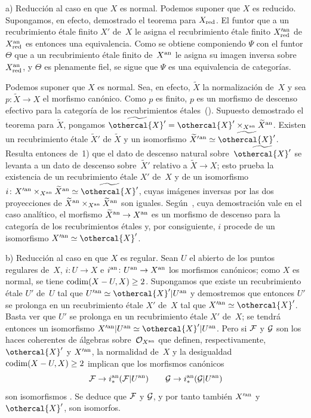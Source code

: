 a) Reducción al caso en que $X$ es normal. Podemos suponer que $X$
es reducido. Supongamos, en efecto, demostrado el teorema
para $X_{\red}$. El funtor que a un recubrimiento étale
finito $X'$ de~$X$ le asigna el recubrimiento étale finito
$X^{\prime\an}_{\red}$ de~$X_{\red}^{\an}$ es entonces una equivalencia.
Como se obtiene componiendo $\Psi$ con el funtor $\Theta$ que
a un recubrimiento étale finito de~$X^{\an}$ le asigna su imagen
inversa sobre~$X_{\red}^{\an}$, y $\Theta$ es plenamente
fiel, se sigue que $\Psi$ es una equivalencia de categorías.

Podemos
suponer que $X$ es normal. Sea, en efecto, $\widetilde{X}$ la
normalización de~$X$ y sea $p\colon\widetilde{X}\to X$ el morfismo
canónico. Como $p$ es finito, $p$ es un morfismo de descenso
efectivo para la categoría de los recubrimientos
étales~(). Supuesto demostrado el teorema
para $\widetilde{X}$, pongamos
$\widetilde{\othercal{X}'}=\othercal{X}'\times_{X^{\an}}\widetilde{X}^{\an}$.
Existen un recubrimiento étale $\widetilde{X}'$ de
$\widetilde{X}$ y un isomorfismo $\widetilde{X}'{}^{\an}\simeq
\widetilde{\othercal{X}'}$. Resulta entonces de~1) que el dato
de descenso natural sobre~$\widetilde{\othercal{X}'}$ se levanta
a un dato de descenso sobre~$\widetilde{X}'$ relativo a
$\widetilde{X}\to X$; esto prueba la existencia de un recubrimiento
étale $X'$ de~$X$ y de un isomorfismo
$i\colon X^{\prime\an}\times_{X^{\an}}\widetilde{X}^{\an}\simeq
\widetilde{\othercal{X}'}$, cuyas imágenes inversas por las dos
proyecciones de
$\widetilde{X}^{\an}\times_{X^{\an}}\widetilde{X}^{\an}$ son iguales.
Según~, cuya demostración vale en el caso analítico,
el morfismo $\widetilde{X}^{\an}\to X^{\an}$ es un morfismo de descenso
para la categoría de los recubrimientos étales y, por consiguiente,
$i$ procede de un isomorfismo $X^{\prime\an}\simeq\othercal{X}'$.

b) Reducción al caso en que $X$ es regular. Sean $U$
el abierto de los puntos regulares de~$X$, $i\colon U\to X$ e
$i^{\an}\colon U^{\an}\to X^{\an}$ los morfismos canónicos; como
$X$ es normal, se tiene $\codim(X-U,X)\geq2$. Supongamos que existe un
recubrimiento étale $U'$ de~$U$ tal que
$U^{\prime\an}\simeq\othercal{X}'|U^{\an}$ y demostremos que entonces $U'$ se
prolonga en un recubrimiento étale $X'$ de~$X$ tal que
$X^{\prime\an}\simeq\othercal{X}'$. Basta ver que $U'$ se prolonga
en un recubrimiento étale $X'$ de~$X$; se tendrá entonces un
isomorfismo $X^{\prime\an}|U^{\an}\simeq\othercal{X}'|U^{\an}$. Pero si
$\cal{F}$ y $\cal{G}$ son los haces coherentes de álgebras
sobre~$\cal{O}_{X^{\an}}$ que definen, respectivamente, $\othercal{X}'$ y
$X^{\prime\an}$, la normalidad de~$X$ y la desigualdad
$\codim(X-U,X)\geq2$ implican que los morfismos canónicos
$$
\cal{F}\to i_*^{\an}(\cal{F}|U^{\an}) \qquad
\cal{G}\to i_*^{\an}(\cal{G}|U^{\an})
$$
son
isomorfismos \cite[~prop]{XII.11}. Se deduce que $\cal{F}$
y $\cal{G}$, y por tanto también $X^{\prime\an}$ y $\othercal{X}'$, son
isomorfos.

